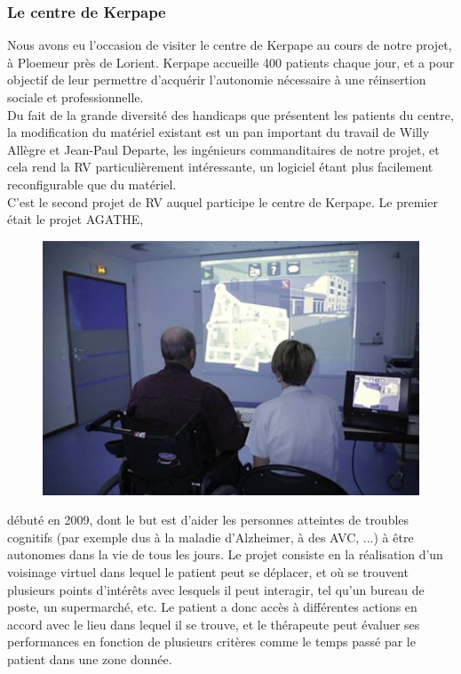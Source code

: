 \subsubsection{Le centre de Kerpape}

Nous avons eu l'occasion de visiter le centre de Kerpape au cours de notre projet, à Ploemeur près de Lorient. Kerpape accueille 400 patients chaque jour, et a pour objectif de leur permettre d'acquérir l'autonomie nécessaire à une réinsertion sociale et professionnelle. \\
Du fait de la grande diversité des handicaps que présentent les patients du centre, la modification du matériel existant est un pan important du travail de Willy Allègre et Jean-Paul Departe, les ingénieurs commanditaires de notre projet, et cela rend la RV particulièrement intéressante, un logiciel étant plus facilement reconfigurable que du matériel.\cite{kerpape}\\


C'est le second projet de RV auquel participe le centre de Kerpape. Le premier était le projet AGATHE,
\begin{figure}
	\centering
	\includegraphics[scale=0.7]{1-PreEtude/img/screen_agathe.png}
\end{figure}
 débuté en 2009, dont le but est d'aider les personnes atteintes de troubles cognitifs (par exemple dus à la maladie d'Alzheimer, à des AVC, ...) à être autonomes dans la vie de tous les jours. Le projet consiste en la réalisation d'un \og voisinage virtuel \fg{} dans lequel le patient peut se déplacer, et où se trouvent plusieurs points d'intérêts avec lesquels il peut interagir, tel qu'un bureau de poste, un supermarché, etc. Le patient a donc accès à différentes actions en accord avec le lieu dans lequel il se trouve, et le thérapeute peut évaluer ses performances en fonction de plusieurs critères comme le temps passé par le patient dans une zone donnée.\cite{agathe}


